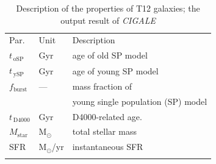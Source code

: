     \begin{table}
\caption[]{Description of the properties of T12 galaxies; the output result of {\em CIGALE}}     
\label{tab: props}
\centering
\begin{tabular}{l l l}
\hline\hline
\noalign{\smallskip}
Par. & Unit & Description\\
\noalign{\smallskip}
\hline
\noalign{\smallskip}
$t_{\,\mathrm{oSP}}$ & Gyr & age of old SP model \\
$t_{\,\mathrm{ySP}}$ & Gyr & age of young SP model \\
$f_\mathrm{burst}$ & --- & mass fraction of \\
& & young single population (SP) model \\
\noalign{\smallskip}
$t_{\,\mathrm{D4000}}$ & Gyr & D4000-related age. \\
\noalign{\smallskip}
$M_\mathrm{star}$ & M$_\odot$ & total stellar mass  \\
SFR & M$_\odot$/yr & instantaneous SFR  \\
\noalign{\smallskip}
\hline
\end{tabular}
\end{table}
